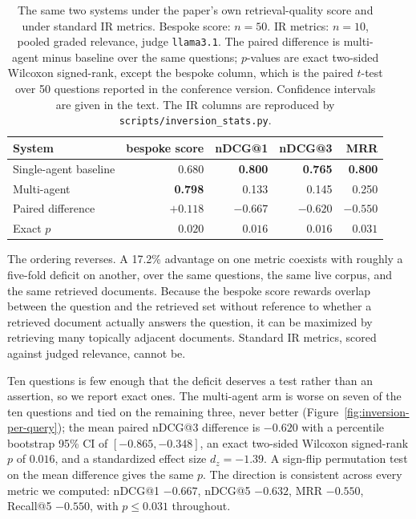 \documentclass[acmsmall,review,anonymous,screen]{acmart}
\begin{document}
\begin{table}[t]
\caption{The same two systems under the paper's own retrieval-quality score and
under standard IR metrics. Bespoke score: $n=50$. IR metrics: $n=10$, pooled
graded relevance, judge \texttt{llama3.1}. The paired difference is
multi-agent minus baseline over the same questions; $p$-values are exact
two-sided Wilcoxon signed-rank, except the bespoke column, which is the paired
$t$-test over 50 questions reported in the conference version. Confidence
intervals are given in the text. The IR columns are reproduced by
\texttt{scripts/inversion\_stats.py}.}
\label{tab:inversion}
\begin{tabular}{lrrrr}
\toprule
System & bespoke score & nDCG@1 & nDCG@3 & MRR \\
\midrule
Single-agent baseline & 0.680 & \textbf{0.800} & \textbf{0.765} & \textbf{0.800} \\
Multi-agent           & \textbf{0.798} & 0.133 & 0.145 & 0.250 \\
\midrule
Paired difference & $+0.118$ & $-0.667$ & $-0.620$ & $-0.550$ \\
Exact $p$         & $0.020$ & $0.016$ & $0.016$ & $0.031$ \\
\bottomrule
\end{tabular}
\end{table}

The ordering reverses. A 17.2\% advantage on one metric coexists with roughly a
five-fold deficit on another, over the same questions, the same live corpus, and
the same retrieved documents. Because the bespoke score rewards overlap between
the question and the retrieved set without reference to whether a retrieved
document actually answers the question, it can be maximized by retrieving many
topically adjacent documents. Standard IR metrics, scored against judged
relevance, cannot be.

Ten questions is few enough that the deficit deserves a test rather than an
assertion, so we report exact ones. The multi-agent arm is worse on seven of the
ten questions and tied on the remaining three, never better
(Figure~\ref{fig:inversion-per-query}); the mean paired
nDCG@3 difference is $-0.620$ with a percentile bootstrap 95\% CI of
$[-0.865, -0.348]$, an exact two-sided Wilcoxon signed-rank $p$ of $0.016$, and
a standardized effect size $d_z = -1.39$. A sign-flip permutation test on the
mean difference gives the same $p$. The direction is consistent across every
metric we computed: nDCG@1 $-0.667$, nDCG@5 $-0.632$, MRR $-0.550$, Recall@5
$-0.550$, with $p \le 0.031$ throughout.
\end{document}
